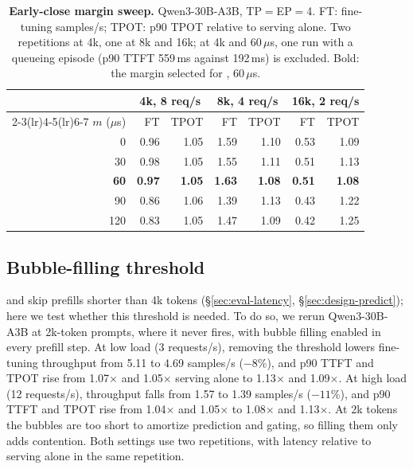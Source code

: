 \begin{table}[t]
  \centering
  \small
  \setlength{\tabcolsep}{4pt}
  \caption{\textbf{Early-close margin sweep.} Qwen3-30B-A3B,
    \ac{TP}$=$\ac{EP}$=$4. FT: fine-tuning samples/s; TPOT: p90
    \ac{TPOT} relative to serving alone. Two repetitions at 4k, one at
    8k and 16k; at 4k and 60\,$\mu$s, one run with a queueing episode
    (p90 \ac{TTFT} 559\,ms against 192\,ms) is excluded. Bold: the margin
    selected for \sys{}, 60\,$\mu$s.}
  \label{tab:appx-margin}
  \begin{tabular}{rrrrrrr}
    \toprule
    & \multicolumn{2}{c}{4k, 8 req/s} & \multicolumn{2}{c}{8k, 4 req/s} & \multicolumn{2}{c}{16k, 2 req/s} \\
    \cmidrule(lr){2-3}\cmidrule(lr){4-5}\cmidrule(lr){6-7}
    $m$ ($\mu$s) & FT & TPOT & FT & TPOT & FT & TPOT \\
    \midrule
    0 & 0.96 & 1.05 & 1.59 & 1.10 & 0.53 & 1.09 \\
    30 & 0.98 & 1.05 & 1.55 & 1.11 & 0.51 & 1.13 \\
    \textbf{60} & \textbf{0.97} & \textbf{1.05} & \textbf{1.63} & \textbf{1.08} & \textbf{0.51} & \textbf{1.08} \\
    90 & 0.86 & 1.06 & 1.39 & 1.13 & 0.43 & 1.22 \\
    120 & 0.83 & 1.05 & 1.47 & 1.09 & 0.42 & 1.25 \\
    \bottomrule
  \end{tabular}
\end{table}

\subsection{Bubble-filling threshold}
\label{sec:appx-threshold}

\cfgThrottled and \sys{} skip prefills shorter than 4k tokens
(\S\ref{sec:eval-latency}, \S\ref{sec:design-predict}); here we test
whether this threshold is needed. To do so, we rerun
Qwen3-30B-A3B at 2k-token prompts, where it never fires, with bubble
filling enabled in every prefill step. At low load (3 requests/s),
removing the threshold lowers fine-tuning throughput from 5.11 to 4.69
samples/s ($-8$\%), and p90 \ac{TTFT} and \ac{TPOT} rise from
1.07$\times$ and 1.05$\times$ serving alone to 1.13$\times$ and
1.09$\times$. At high load (12 requests/s), throughput falls from 1.57
to 1.39 samples/s ($-11$\%), and p90 \ac{TTFT} and \ac{TPOT} rise from
1.04$\times$ and 1.05$\times$ to 1.08$\times$ and 1.13$\times$. At 2k
tokens the bubbles are too short to amortize prediction and gating, so
filling them only adds contention. Both settings use two
repetitions, with latency relative to serving alone in the same
repetition.

